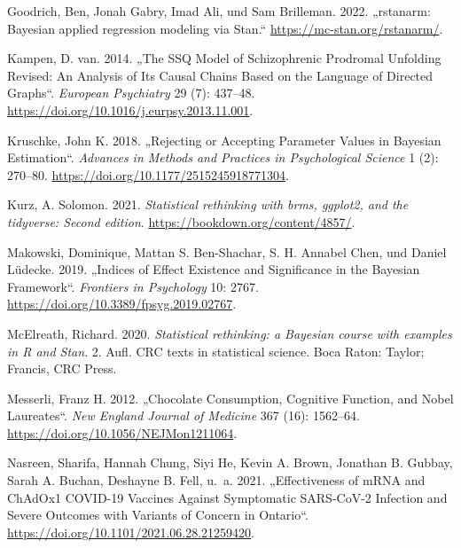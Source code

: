 \documentclass[
  a4paper,
  DIV=11]{scrreprt}
\newlength{\cslhangindent}
\newlength{\cslentryspacingunit} %
\newenvironment{CSLReferences}[2] %
 {%
  \setlength{\parindent}{0pt}
  \ifodd #1
  \let\oldpar\par
  \def\par{\hangindent=\cslhangindent\oldpar}
  \fi
  \setlength{\parskip}{#2\cslentryspacingunit}
 }%
 {}
\theoremstyle{definition}
\theoremstyle{remark}
\begin{document}
\begin{CSLReferences}{1}{0}
\leavevmode{}%
Goodrich, Ben, Jonah Gabry, Imad Ali, und Sam Brilleman. 2022.
{„rstanarm: {Bayesian} applied regression modeling via {Stan}.``}
\url{https://mc-stan.org/rstanarm/}.

\leavevmode{}%
Kampen, D. van. 2014. {„The {SSQ} Model of Schizophrenic Prodromal
Unfolding Revised: An Analysis of Its Causal Chains Based on the
Language of Directed Graphs``}. \emph{European Psychiatry} 29 (7):
437--48. \url{https://doi.org/10.1016/j.eurpsy.2013.11.001}.

\leavevmode{}%
Kruschke, John K. 2018. {„Rejecting or Accepting Parameter Values in
Bayesian Estimation``}. \emph{Advances in Methods and Practices in
Psychological Science} 1 (2): 270--80.
\url{https://doi.org/10.1177/2515245918771304}.

\leavevmode{}%
Kurz, A. Solomon. 2021. \emph{Statistical rethinking with brms, ggplot2,
and the tidyverse: Second edition}.
\url{https://bookdown.org/content/4857/}.

\leavevmode{}%
Makowski, Dominique, Mattan S. Ben-Shachar, S. H. Annabel Chen, und
Daniel Lüdecke. 2019. {„Indices of Effect Existence and Significance in
the Bayesian Framework``}. \emph{Frontiers in Psychology} 10: 2767.
\url{https://doi.org/10.3389/fpsyg.2019.02767}.

\leavevmode{}%
McElreath, Richard. 2020. \emph{Statistical rethinking: a Bayesian
course with examples in R and Stan}. 2. Aufl. {CRC} texts in statistical
science. Boca Raton: Taylor; Francis, {CRC} Press.

\leavevmode{}%
Messerli, Franz H. 2012. {„Chocolate Consumption, Cognitive Function,
and Nobel Laureates``}. \emph{New England Journal of Medicine} 367 (16):
1562--64. \url{https://doi.org/10.1056/NEJMon1211064}.

\leavevmode{}%
Nasreen, Sharifa, Hannah Chung, Siyi He, Kevin A. Brown, Jonathan B.
Gubbay, Sarah A. Buchan, Deshayne B. Fell, u.~a. 2021. {„Effectiveness
of {mRNA} and {ChAdOx}1 {COVID}-19 Vaccines Against Symptomatic
{SARS}-{CoV}-2 Infection and Severe Outcomes with Variants of Concern in
Ontario``}. \url{https://doi.org/10.1101/2021.06.28.21259420}.


\end{CSLReferences}
\end{document}
